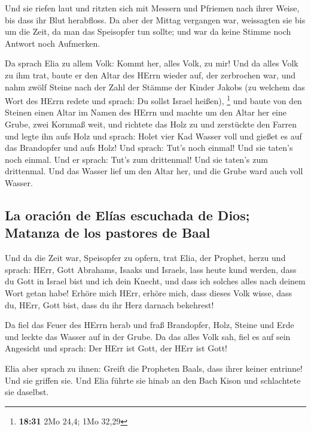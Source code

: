  Und sie riefen laut und ritzten sich mit Messern und
Pfriemen nach ihrer Weise, bis dass ihr Blut herabfloss. 
Da aber der Mittag vergangen war, weissagten sie bis um die Zeit, da man
das Speisopfer tun sollte; und war da keine Stimme noch Antwort noch
Aufmerken.

 Da sprach Elia zu allem Volk: Kommt her, alles Volk, zu
mir! Und da alles Volk zu ihm trat, baute er den Altar des HErrn wieder
auf, der zerbrochen war,  und nahm zwölf Steine nach der
Zahl der Stämme der Kinder Jakobs (zu welchem das Wort des HErrn redete
und sprach: Du sollst Israel heißen), \footnote{\textbf{18:31} 2Mo 24,4;
  1Mo 32,29}  und baute von den Steinen einen Altar im
Namen des HErrn und machte um den Altar her eine Grube, zwei Kornmaß
weit,  und richtete das Holz zu und zerstückte den Farren
und legte ihn aufs Holz  und sprach: Holet vier Kad
Wasser voll und gießet es auf das Brandopfer und aufs Holz! Und sprach:
Tut's noch einmal! Und sie taten's noch einmal. Und er sprach: Tut's zum
drittenmal! Und sie taten's zum drittenmal.  Und das
Wasser lief um den Altar her, und die Grube ward auch voll Wasser.

\hypertarget{la-oraciuxf3n-de-eluxedas-escuchada-de-dios-matanza-de-los-pastores-de-baal}{%
\subsection{La oración de Elías escuchada de Dios; Matanza de los
pastores de
Baal}\label{la-oraciuxf3n-de-eluxedas-escuchada-de-dios-matanza-de-los-pastores-de-baal}}

 Und da die Zeit war, Speisopfer zu opfern, trat Elia,
der Prophet, herzu und sprach: HErr, Gott Abrahams, Isaaks und Israels,
lass heute kund werden, dass du Gott in Israel bist und ich dein Knecht,
und dass ich solches alles nach deinem Wort getan habe! 
Erhöre mich HErr, erhöre mich, dass dieses Volk wisse, dass du, HErr,
Gott bist, dass du ihr Herz darnach bekehrest!

 Da fiel das Feuer des HErrn herab und fraß Brandopfer,
Holz, Steine und Erde und leckte das Wasser auf in der Grube.
 Da das alles Volk sah, fiel es auf sein Angesicht und
sprach: Der HErr ist Gott, der HErr ist Gott!

 Elia aber sprach zu ihnen: Greift die Propheten Baals,
dass ihrer keiner entrinne! Und sie griffen sie. Und Elia führte sie
hinab an den Bach Kison und schlachtete sie daselbst.

